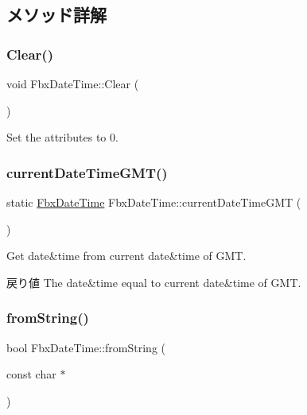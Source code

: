 \subsection{メソッド詳解}
\mbox{\label{class_fbx_date_time_a56d994c06a311b0cb0007afea1ed24c4}} 
\subsubsection{\texorpdfstring{Clear()}{Clear()}}
{\footnotesize\ttfamily void Fbx\+Date\+Time\+::\+Clear (\begin{DoxyParamCaption}{ }\end{DoxyParamCaption})}



Set the attributes to 0. 

\mbox{\label{class_fbx_date_time_aa5ad0089f7a32226d003c1785250a274}} 
\subsubsection{\texorpdfstring{current\+Date\+Time\+G\+M\+T()}{currentDateTimeGMT()}}
{\footnotesize\ttfamily static \hyperlink{class_fbx_date_time}{Fbx\+Date\+Time} Fbx\+Date\+Time\+::current\+Date\+Time\+G\+MT (\begin{DoxyParamCaption}{ }\end{DoxyParamCaption})\hspace{0.3cm}{\ttfamily [static]}}

Get date\&time from current date\&time of G\+MT. \begin{DoxyReturn}{戻り値}
The date\&time equal to current date\&time of G\+MT. 
\end{DoxyReturn}
\mbox{\label{class_fbx_date_time_ad1139b0ea8be739b38956076c5bfd367}} 
\subsubsection{\texorpdfstring{from\+String()}{fromString()}}
{\footnotesize\ttfamily bool Fbx\+Date\+Time\+::from\+String (\begin{DoxyParamCaption}\item[{const char $\ast$}]{ }\end{DoxyParamCaption})}

